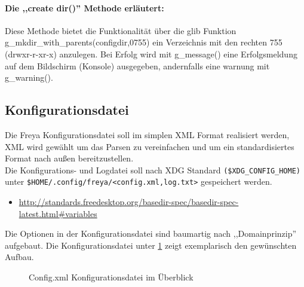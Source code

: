 \paragraph{Die ,,create dir()'' Methode erläutert:}
Diese Methode bietet die Funktionalität über die glib Funktion g\_mkdir\_with\_parents(configdir,0755) ein Verzeichnis mit den rechten 755 (drwxr-r-xr-x) anzulegen. Bei Erfolg wird mit g\_message() eine Erfolgsmeldung auf dem Bildschirm (Konsole)
ausgegeben, andernfalls eine warnung mit g\_warning().



\subsection{Konfigurationsdatei}

Die Freya Konfigurationsdatei soll im simplen XML Format realisiert werden, XML wird gewählt um das Parsen zu vereinfachen und um
ein standardisiertes Format nach außen bereitzustellen. 
\\
Die Konfigurations- und Logdatei soll nach XDG Standard \verb+($XDG_CONFIG_HOME)+ unter \verb+$HOME/.config/freya/<config.xml,log.txt>+ gespeichert werden.

\begin{itemize}
    \item \url{http://standards.freedesktop.org/basedir-spec/basedir-spec-latest.html#variables}
\end{itemize}

Die Optionen in der Konfigurationsdatei sind baumartig nach ,,Domainprinzip'' aufgebaut. Die Konfigurationsdatei unter \ref{c_config}
zeigt exemplarisch den gewünschten Aufbau.
\begin{figure}[htb!]
    
    \caption{Config.xml Konfigurationsdatei im Überblick}
    \label{c_config}
\end{figure}


\newpage
